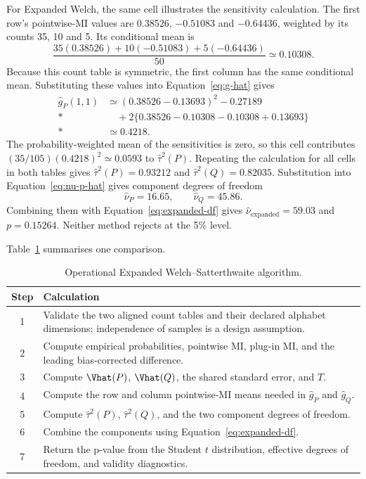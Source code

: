 For Expanded Welch, the same cell illustrates the sensitivity calculation.
The first row's pointwise-MI values are 0.38526, \(-0.51083\) and
\(-0.64436\), weighted by its counts 35, 10 and 5. Its conditional mean is
\begin{equation*}
 \frac{35(0.38526)+10(-0.51083)+5(-0.64436)}{50}
 \simeq0.10308.
\end{equation*}
Because this count table is symmetric, the first column has the same
conditional mean. Substituting these values into Equation~\eqref{eq:g-hat} gives
\begin{align*}
 \widehat g_P(1,1)
 &\simeq (0.38526-0.13693)^2-0.27189\\*
 &\quad+2\{0.38526-0.10308-0.10308+0.13693\}\\*
 &\simeq0.4218.
\end{align*}
The probability-weighted mean of the sensitivities is zero, so this cell
contributes \((35/105)(0.4218)^2\simeq0.0593\) to
\(\widehat\tau^2(P)\). Repeating the calculation for all cells in both
tables gives \(\widehat\tau^2(P)=0.93212\) and
\(\widehat\tau^2(Q)=0.82035\). Substitution into
Equation~\eqref{eq:nu-p-hat} gives component degrees of freedom
\begin{equation}
  \widehat\nu_P=16.65,
  \qquad
  \widehat\nu_Q=45.86.
\end{equation}
Combining them with Equation~\eqref{eq:expanded-df} gives
\(\widehat\nu_{\mathrm{expanded}}=59.03\) and \(p=0.15264\).
Neither method rejects at the 5\% level.

\pagebreak[3]
\medskip
{}
\label{sec:expanded-complexity}

Table~\ref{tab:expanded-algorithm} summarises one comparison.

\begin{table}[htbp]
\centering
\caption{Operational Expanded Welch--Satterthwaite algorithm.}
\label{tab:expanded-algorithm}
\begin{tabularx}{\textwidth}{@{}cX@{}}
\toprule
Step & Calculation \\
\midrule
1 & Validate the two aligned count tables and their declared alphabet dimensions; independence of samples is a design assumption. \\
2 & Compute empirical probabilities, pointwise MI, plug-in MI, and the leading bias-corrected difference. \\
3 & Compute \(\Vhat(P)\), \(\Vhat(Q)\), the shared standard error, and \(T\). \\
4 & Compute the row and column pointwise-MI means needed in \(\widehat g_P\) and \(\widehat g_Q\). \\
5 & Compute \(\widehat\tau^2(P)\), \(\widehat\tau^2(Q)\), and the two component degrees of freedom. \\
6 & Combine the components using Equation~\eqref{eq:expanded-df}. \\
7 & Return the p-value from the Student \(t\) distribution, effective degrees of freedom, and validity diagnostics. \\
\bottomrule
\end{tabularx}
\end{table}

